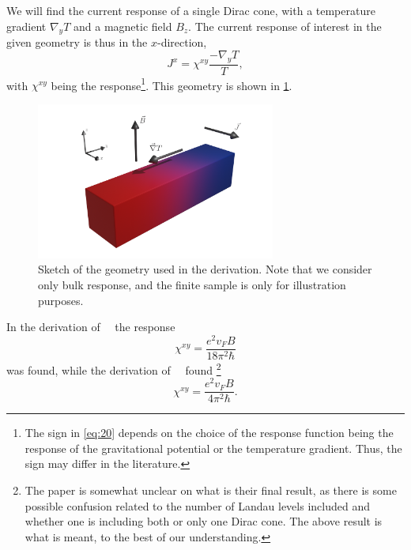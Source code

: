 We will find the current response of a single Dirac cone, with a temperature gradient $\nabla_y T$ and a magnetic field $B_z$.
The current response of interest in the given geometry is thus in the $x$-direction,
\begin{equation}\label{eq:20}
  J^x = \chi ^{xy} \frac{- \nabla _yT}{T},
\end{equation}
with $\chi^{xy}$  being the response\footnote{The sign in \cref{eq:20} depends on the choice of the response function being the response of the gravitational potential or the temperature gradient. Thus, the sign may differ in the literature.}.
This geometry is shown in \cref{fig:setup}.
\begin{figure}[ht]
  \centering
  \includegraphics[width=0.7\textwidth]{figures/setup.png}
  \caption{Sketch of the geometry used in the derivation. Note that we consider only bulk response, and the finite sample is only for illustration purposes. \label{fig:setup}}
\end{figure}
In the derivation of~\citeauthor{chernodubGenerationNernstCurrent2018}~\cite{chernodubGenerationNernstCurrent2018} the response
\begin{equation}
  \chi ^{xy} = \frac{e^2 v_F B}{18 \pi ^2 \hbar }
\end{equation}
was found, while the derivation of~\citeauthor{arjonaFingerprintsConformalAnomaly2019}~\cite{arjonaFingerprintsConformalAnomaly2019} found
\footnote{The paper is somewhat unclear on what is their final result, as there is some possible confusion related to the number of Landau levels included and whether one is including both or only one Dirac cone.
The above result is what is meant, to the best of our understanding.}
\begin{equation}
  \chi ^{xy} = \frac{e^2 v_F B}{4 \pi ^2 \hbar }.
\end{equation}

